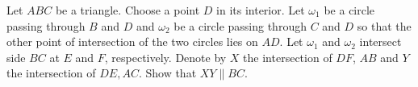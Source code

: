Let $ABC$ be a triangle. Choose a point $D$ in its interior. Let $\omega_1$ be a circle passing through $B$ and $D$ and $\omega_2$ be a circle passing through $C$ and $D$ so that the other point of intersection of the two circles lies on $AD$. Let $\omega_1$ and $\omega_2$ intersect side $BC$ at $E$ and $F$, respectively. Denote by $X$ the intersection of $DF$, $AB$ and $Y$ the intersection of $DE, AC$. Show that $XY \parallel BC$.